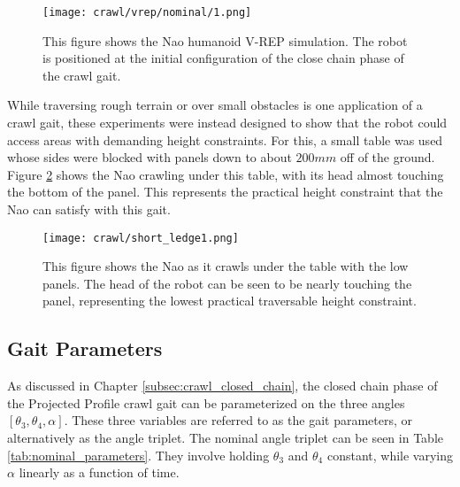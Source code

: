 \begin{figure}
  \centering
  \texttt{[image: crawl/vrep/nominal/1.png]}
  \caption{This figure shows the Nao humanoid V-REP simulation. 
           The robot is positioned at the initial configuration of the close chain phase
           of the crawl gait.}
  \label{fig:vrep_nao_nom_gait_single_frame1}
\end{figure}

While traversing rough terrain or over small obstacles is one application of a crawl gait,
these experiments were instead designed to show that the robot could access areas with
demanding height constraints. For this, a small table was used whose sides were blocked
with panels down to about $200 mm$ off of the ground. 
Figure \ref{fig:short_ledge_nao_nom_gait_single_frame1} shows the Nao crawling under this table,
with its head almost touching the bottom of the panel. This represents the practical height
constraint that the Nao can satisfy with this gait.

\begin{figure}
  \centering
  \texttt{[image: crawl/short\_ledge1.png]}
  \caption{This figure shows the Nao as it crawls under the table with the low panels.
           The head of the robot can be seen to be nearly touching the panel,
           representing the lowest practical traversable height constraint.}
  \label{fig:short_ledge_nao_nom_gait_single_frame1}
\end{figure}

\subsection{Gait Parameters} \label{subsec:gait_params}
As discussed in Chapter \ref{subsec:crawl_closed_chain}, the closed chain phase of the 
Projected Profile crawl gait can be parameterized on the three angles $[\theta_3, \theta_4, \alpha]$.
These three variables are referred to as the gait parameters, or alternatively as the angle triplet.
The nominal angle triplet can be seen in Table \ref{tab:nominal_parameters}. They involve holding
$\theta_3$ and $\theta_4$ constant, while varying $\alpha$ linearly as a function of time.

